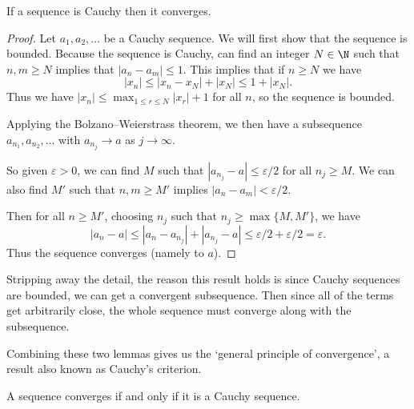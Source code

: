 \begin{lemma}[Completeness]
	If a sequence is Cauchy then it converges.
\end{lemma}
\begin{proof}
	Let $a_1, a_2, \dots$ be a Cauchy sequence. We will first show that the sequence is bounded. 
	Because the sequence is Cauchy, can find an integer $N \in \N$ such that $n, m \geq N$ implies that $|a_n - a_m| \leq 1$.
	This implies that if $n \geq N$ we have
	$$
		|x_n| \leq |x_n - x_{N}| + |x_{N}| \leq 1 + |x_{N}|.
	$$
	Thus we have $\displaystyle |x_n| \leq \max_{1 \leq r \leq N} |x_r| + 1$ for all $n$, so the sequence is bounded.

	Applying the Bolzano–Weierstrass theorem, we then have a subsequence $a_{n_1}, a_{n_2}, \dots$ with $a_{n_j} \rightarrow a$ as $j \rightarrow \infty$. 
	
	So given $\varepsilon > 0$, we can find $M$ such that $|a_{n_j} - a| \leq \varepsilon/2$ for all $n_j \geq M$. We can also find $M'$ such that $n, m \geq M'$ implies $|a_n - a_{m}| < \varepsilon/2$. 
	
	Then for all $n \geq M'$, choosing $n_j$ such that $n_j \geq \max\{M, M'\}$, we have
	$$
		|a_n - a| \leq |a_n - a_{n_j}| + |a_{n_j} - a| \leq \varepsilon/2 + \varepsilon/2 = \varepsilon.
	$$
	Thus the sequence converges (namely to $a$).
\end{proof}

Stripping away the detail, the reason this result holds is since Cauchy sequences are bounded, we can get a convergent subsequence. Then since all of the terms get arbitrarily close, the whole sequence must converge along with the subsequence.

Combining these two lemmas gives us the `general principle of convergence', a result also known as Cauchy's criterion.

\begin{theorem}
	A sequence converges if and only if it is a Cauchy sequence.
\end{theorem}


